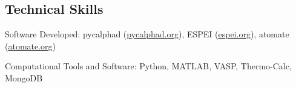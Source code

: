 \documentclass[10pt,letterpaper]{article}
\newenvironment{indentsection}[1]%
{\begin{list}{}%
  {\setlength{\leftmargin}{#1}}%
  \item[]%
}
{\end{list}}
\begin{document}
\subsection*{Technical Skills}

\begin{indentsection}{\parindent}
\begin{description*}
  \item [Software Developed:]
  pycalphad (\href{https://pycalphad.org}{pycalphad.org}),
  ESPEI (\href{https://espei.org}{espei.org}),
  atomate (\href{https://atomate.org}{atomate.org})
  \item[Computational Tools and Software:]
  Python, MATLAB, VASP, Thermo-Calc, MongoDB
\end{description*}
\end{indentsection}
\end{document}
